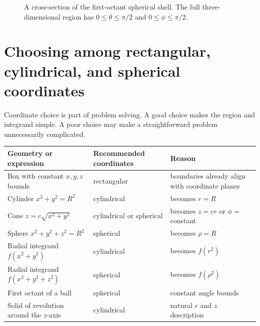 \documentclass[11pt,oneside]{book}
\begin{document}
\begin{figure}[H]
\centering
{}
\caption{A cross-section of the first-octant spherical shell. The full three-dimensional region has $0\le\theta\le\pi/2$ and $0\le\phi\le\pi/2$.}
\end{figure}

\section{Choosing among rectangular, cylindrical, and spherical coordinates}

Coordinate choice is part of problem solving. A good choice makes the region and integrand simple. A poor choice may make a straightforward problem unnecessarily complicated.

\begin{center}
\begin{tabularx}{\textwidth}{>{\raggedright\arraybackslash}p{}>{\raggedright\arraybackslash}p{}>{\raggedright\arraybackslash}X}
\toprule
Geometry or expression & Recommended coordinates & Reason \\
\midrule
Box with constant $x,y,z$ bounds & rectangular & boundaries already align with coordinate planes \\
Cylinder $x^2+y^2=R^2$ & cylindrical & becomes $r=R$ \\
Cone $z=c\sqrt{x^2+y^2}$ & cylindrical or spherical & becomes $z=cr$ or $\phi=$ constant \\
Sphere $x^2+y^2+z^2=R^2$ & spherical & becomes $\rho=R$ \\
Radial integrand $f(x^2+y^2)$ & cylindrical & becomes $f(r^2)$ \\
Radial integrand $f(x^2+y^2+z^2)$ & spherical & becomes $f(\rho^2)$ \\
First octant of a ball & spherical & constant angle bounds \\
Solid of revolution around the $z$-axis & cylindrical & natural $r$ and $z$ description \\
\bottomrule
\end{tabularx}
\end{center}
\end{document}
